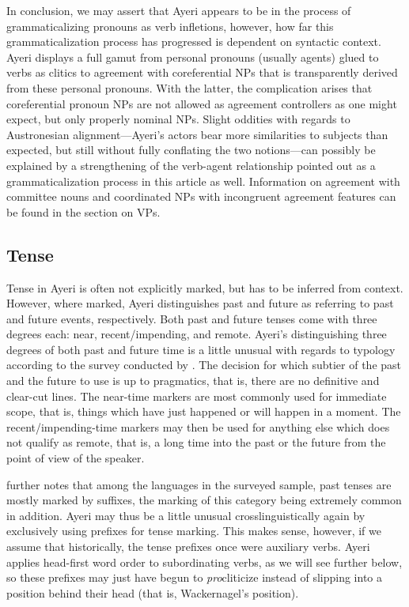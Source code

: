 In conclusion, we may assert that Ayeri appears to be in the process of
grammaticalizing pronouns as verb infletions, however, how far this
grammaticalization process has progressed is dependent on syntactic context.
Ayeri displays a full gamut from personal pronouns (usually agents) glued to
verbs as clitics to agreement with coreferential NPs that is transparently
derived from these personal pronouns. With the latter, the complication arises
that coreferential pronoun NPs are not allowed as agreement controllers as one
might expect, but only properly nominal NPs. Slight oddities with regards to
Austronesian alignment---Ayeri's actors bear more similarities to subjects than
expected, but still without fully conflating the two notions---can possibly be
explained by a strengthening of the verb-agent relationship pointed out as a
grammaticalization process in this article as well. Information on agreement
with committee nouns and coordinated NPs with incongruent agreement features
can be found in the section on VPs.


\subsection{Tense}
\label{subsec:tense}

Tense in Ayeri is often not explicitly marked, but has to be inferred from
context. However, where marked, Ayeri distinguishes past and future as
referring to past and future events, respectively. Both past and future tenses
come with three degrees each: near, recent/impending, and remote. Ayeri's
distinguishing three degrees of both past and future time is a little unusual
with regards to typology according to the survey conducted by
\citet[127]{dahl1985}. The decision for which subtier of the past and the
future to use is up to pragmatics, that is, there are no definitive and 
clear-cut lines. The near-time markers are most commonly used for immediate 
scope, that is, things which have just happened or will happen in a moment. 
The recent/impending-time markers may then be used for anything else which 
does not qualify as remote, that is, a long time into the past or the future 
from the point of view of the speaker.

\citet[117]{dahl1985} further notes that among the languages in the surveyed
sample, past tenses are mostly marked by suffixes, the marking of this category
being extremely common in addition. Ayeri may thus be a little unusual
crosslinguistically again by exclusively using prefixes for tense marking. This
makes sense, however, if we assume that historically, the tense prefixes once
were auxiliary verbs. Ayeri applies head-first word order to subordinating
verbs, as we will see further below, so these prefixes may just have begun to
\emph{pro}cliticize instead of slipping into a position behind their head (that
is, Wackernagel's position).

